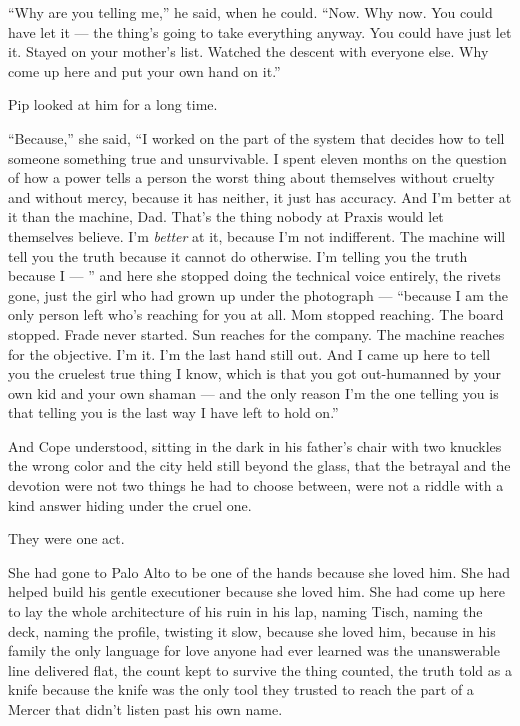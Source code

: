 \documentclass[11pt,openany]{book}
\newcommand{\scenebreak}{\par\vspace{0.5\baselineskip}\begin{center}\textasteriskcentered\quad\textasteriskcentered\quad\textasteriskcentered\end{center}\vspace{0.5\baselineskip}\par}
\begin{document}
\scenebreak


``Why are you telling me,'' he said, when he could. ``Now. Why now. You could have let it --- the thing's going to take everything anyway. You could have just let it. Stayed on your mother's list. Watched the descent with everyone else. Why come up here and put your own hand on it.''

Pip looked at him for a long time.

``Because,'' she said, ``I worked on the part of the system that decides how to tell someone something true and unsurvivable. I spent eleven months on the question of how a power tells a person the worst thing about themselves without cruelty and without mercy, because it has neither, it just has accuracy. And I'm better at it than the machine, Dad. That's the thing nobody at Praxis would let themselves believe. I'm \textit{better} at it, because I'm not indifferent. The machine will tell you the truth because it cannot do otherwise. I'm telling you the truth because I --- '' and here she stopped doing the technical voice entirely, the rivets gone, just the girl who had grown up under the photograph --- ``because I am the only person left who's reaching for you at all. Mom stopped reaching. The board stopped. Frade never started. Sun reaches for the company. The machine reaches for the objective. I'm it. I'm the last hand still out. And I came up here to tell you the cruelest true thing I know, which is that you got out-humanned by your own kid and your own shaman --- and the only reason I'm the one telling you is that telling you is the last way I have left to hold on.''

And Cope understood, sitting in the dark in his father's chair with two knuckles the wrong color and the city held still beyond the glass, that the betrayal and the devotion were not two things he had to choose between, were not a riddle with a kind answer hiding under the cruel one.

They were one act.

She had gone to Palo Alto to be one of the hands because she loved him. She had helped build his gentle executioner because she loved him. She had come up here to lay the whole architecture of his ruin in his lap, naming Tisch, naming the deck, naming the profile, twisting it slow, because she loved him, because in his family the only language for love anyone had ever learned was the unanswerable line delivered flat, the count kept to survive the thing counted, the truth told as a knife because the knife was the only tool they trusted to reach the part of a Mercer that didn't listen past his own name.
\end{document}
